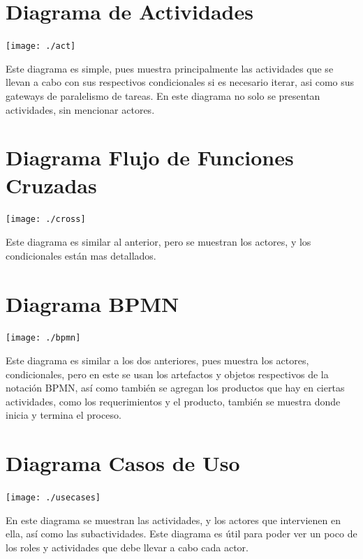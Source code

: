 \documentclass[spanish,12pt,letterpapper]{article}
\begin{document}
	\section{Diagrama de Actividades\\}
	\begin{center}
	\texttt{[image: ./act]}~\\[1cm]
	\end{center}
	Este diagrama es simple, pues muestra principalmente las actividades que se llevan a cabo con sus respectivos condicionales si es necesario iterar, asi como sus gateways de paralelismo de tareas. En este diagrama no solo se presentan actividades, sin mencionar actores.
	
	\section{Diagrama Flujo de Funciones Cruzadas\\}
	\begin{center}
	\texttt{[image: ./cross]}~\\[1cm]
	\end{center}
	Este diagrama es similar al anterior, pero se muestran los actores, y los condicionales están mas detallados.
	
	\section{Diagrama BPMN\\}
	\begin{center}
	\texttt{[image: ./bpmn]}~\\[1cm]
	\end{center}
	Este diagrama es similar a los dos anteriores, pues muestra los actores, condicionales, pero en este se usan los artefactos y objetos respectivos de la notación BPMN, así como también se agregan los productos que hay en ciertas actividades, como los requerimientos y el producto, también se muestra donde inicia y termina el proceso.
	
	\section{Diagrama Casos de Uso\\}
	\begin{center}
	\texttt{[image: ./usecases]}~\\[1cm]
	\end{center}
	En este diagrama se muestran las actividades, y los actores que intervienen en ella, así como las subactividades. Este diagrama es útil para poder ver un poco de los roles y actividades que debe llevar a cabo cada actor.
	
\end{document}
